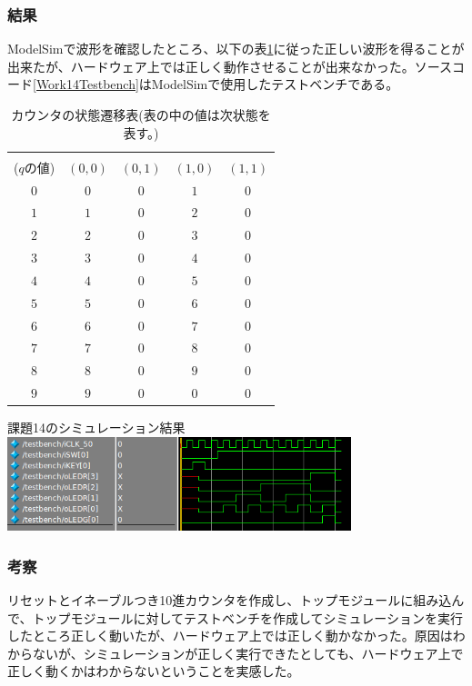 \documentclass[a4paper]{jarticle}
\begin{document}
\subsubsection{結果}
ModelSimで波形を確認したところ、以下の表\ref{Work14StateTransitionTable}に従った正しい波形を得ることが出来たが、ハードウェア上では正しく動作させることが出来なかった。ソースコード\ref{Work14Testbench}はModelSimで使用したテストベンチである。

\begin{table}[!h]
	\begin{center}
		\caption{カウンタの状態遷移表(表の中の値は次状態を表す。)}
		\label{Work14StateTransitionTable}
		\begin{tabular}{|c||c|c|c|c|}
			\hline
			\backslashbox{現状態\\($q$の値)}{$\left(en,clr\right)$}	&$\left(0,0\right)$	&$\left(0,1\right)$	&$\left(1,0\right)$	&$\left(1,1\right)$\\	\hline
			$0$							&$0$			&$0$			&$1$			&$0$\\			\hline
			$1$							&$1$			&$0$			&$2$			&$0$\\			\hline
			$2$							&$2$			&$0$			&$3$			&$0$\\			\hline
			$3$							&$3$			&$0$			&$4$			&$0$\\			\hline
			$4$							&$4$			&$0$			&$5$			&$0$\\			\hline
			$5$							&$5$			&$0$			&$6$			&$0$\\			\hline
			$6$							&$6$			&$0$			&$7$			&$0$\\			\hline
			$7$							&$7$			&$0$			&$8$			&$0$\\			\hline
			$8$							&$8$			&$0$			&$9$			&$0$\\			\hline
			$9$							&$9$			&$0$			&$0$			&$0$\\			\hline
		\end{tabular}
	\end{center}
\end{table}
課題14のシミュレーション結果\\
\includegraphics[width=10cm]{work14/Simulation.png}
\subsubsection{考察}
リセットとイネーブルつき10進カウンタを作成し、トップモジュールに組み込んで、トップモジュールに対してテストベンチを作成してシミュレーションを実行したところ正しく動いたが、ハードウェア上では正しく動かなかった。原因はわからないが、シミュレーションが正しく実行できたとしても、ハードウェア上で正しく動くかはわからないということを実感した。
\end{document}
